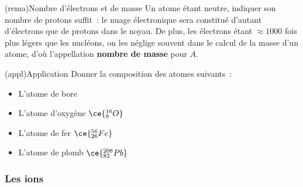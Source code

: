 \documentclass[../../main/main.tex]{subfiles}
\begin{document}
\begin{tcb}[label=rema:atomeneutre](rema){Nombre d'électrons et de masse}
	Un atome étant neutre, indiquer son nombre de protons suffit~: le nuage
	électronique sera constitué d'autant d'électrons que de protons dans le
	noyau.
	\smallbreak
	De plus, les électrons étant $\approx 1000$ fois plus légers que les
	nucléons, on les néglige souvent dans le calcul de la masse d'un atome, d'où
	l'appellation \textbf{nombre de masse} pour $A$.
\end{tcb}
\begin{tcb}[label=exem:atomes](appl){Application}
	Donner la composition des atomes suivants~:
	\smallbreak
	\begin{isd}
		\begin{itemize}
			\item L'atome de bore 
			      \smallbreak
			\item L'atome d'oxygène $\ce{^{16}_{8}O}$
			      \smallbreak
		\end{itemize}
		\tcblower
		\begin{itemize}
			\item L'atome de fer $ \ce{^{56}_{26}Fe}$
			      \smallbreak
			\item L'atome de plomb $\ce{^{208}_{82}Pb}$
			      \smallbreak
		\end{itemize}
	\end{isd}
\end{tcb}

\subsubsection{Les ions}
\end{document}
